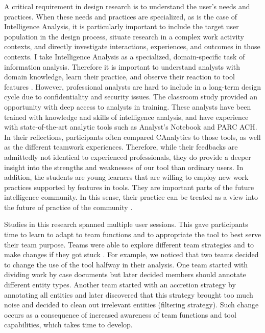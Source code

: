 A critical requirement in design research is to understand the user's needs and practices. When these needs and practices are specialized, as is the case of Intelligence Analysis, it is 
particularly important to include the target user population in 
the design process, situate research in a complex work activity contexts, and directly investigate interactions, experiences, and outcomes in those contexts. I take Intelligence Analysis as a specialized,
domain-specific task of information analysis. Therefore it is important to understand analysts with domain knowledge, 
learn their practice, and observe their reaction to tool features \citep{Scholtz2014}. 
However, professional analysts are hard to include 
in a long-term design cycle due to confidentiality and security 
issues. The classroom study provided an opportunity with deep 
access to analysts in training. These analysts have been trained 
with knowledge and skills of intelligence analysis, and have experience with state-of-the-art analytic
tools such as Analyst's Notebook and PARC ACH. In their reflections, participants often compared CAnalytics to
those tools, as well as the different teamwork experiences. Therefore, while their feedbacks are
admittedly not identical to experienced professionals,
they do provide a deeper insight into the strengths and
weaknesses of our tool than ordinary users. In addition, the students are young learners
that are willing to employ new work practices supported by features in
tools. They are important parts of the future intelligence community. In
this sense, their practice can be treated as a view into the future of
practice of the community \citep{Martin2014}.

Studies in this research spanned multiple user sessions.
This gave participants time to learn to adapt to team functions and to appropriate
the tool to best serve their team purpose. Teams were able to explore different team strategies and to
make changes if they got stuck \citep{Stahl2006}. For example, we
noticed that two teams decided to change the use of the tool halfway in
their analysis. One team started with dividing work by case documents
but later decided members should annotate different entity types.
Another team started with an accretion strategy by annotating all
entities and later discovered that this strategy brought too much
noise and decided to clean out irrelevant entities (filtering
strategy). Such change occurs as a consequence of increased awareness of
team functions and tool capabilities, which takes time to develop.

